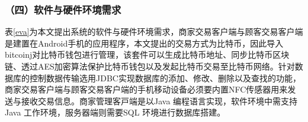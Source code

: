 	\subsubsection{（四）软件与硬件环境需求}
	表\ref{eva}为本文提出系统的软件与硬件环境需求，商家交易客户端与顾客交易客户端是建置在Android手机的应用程序，本文提出的交易方式为比特币，因此导入bitcoinj\supercite{Bitcoinclients}对比特币钱包进行管理，该套件可以生成比特币地址、同步比特币区块链、透过AES加密算法保护比特币钱包以及发起比特币交易至比特币网络。针对数据库的控制数据传输选用JDBC\supercite{JDBCdatabaseaccesswithJava:atutorialandannotatedreference}实现数据库的添加、修改、删除以及查找的功能，商家交易客户端与顾客交易客户端的手机移动设备必须要内置NFC传感器用来发送与接收交易信息。商家管理客⼾端是以Java 编程语⾔实现，软件环境中需⽀持Java ⼯作环境，服务器端则需要SQL 环境进行数据库搭建。


